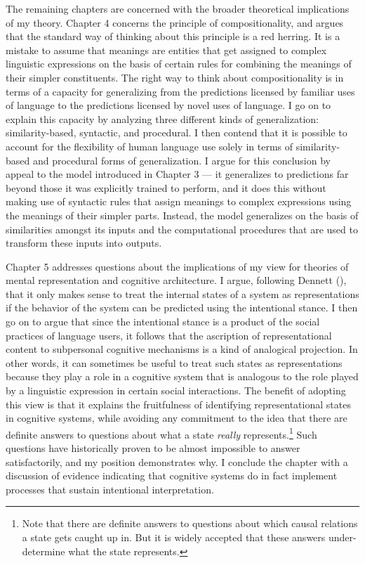 The remaining chapters are concerned with the broader theoretical implications of my theory. Chapter 4 concerns the principle of compositionality, and argues that the standard way of thinking about this principle is a red herring. It is a mistake to assume that meanings are entities that get assigned to complex linguistic expressions on the basis of certain rules for combining the meanings of their simpler constituents. The right way to think about compositionality is in terms of a capacity for generalizing from the predictions licensed by familiar uses of language to the predictions licensed by novel uses of language. I go on to explain this capacity by analyzing three different kinds of generalization: similarity-based, syntactic, and procedural. I then contend that it is possible to account for the flexibility of human language use solely in terms of similarity-based and procedural forms of generalization. I argue for this conclusion by appeal to the model introduced in Chapter 3 --- it generalizes to predictions far beyond those it was explicitly trained to perform, and it does this without making use of syntactic rules that assign meanings to complex expressions using the meanings of their simpler parts. Instead, the model generalizes on the basis of similarities amongst its inputs and the computational procedures that are used to transform these inputs into outputs. 

Chapter 5 addresses questions about the implications of my view for theories of mental representation and cognitive architecture. I argue, following Dennett (\citeyear{Dennett:1987}), that it only makes sense to treat the internal states of a system as representations if the behavior of the system can be predicted using the intentional stance. I then go on to argue that since the intentional stance is a product of the social practices of language users, it follows that the ascription of representational content to subpersonal cognitive mechanisms is a kind of analogical projection. In other words, it can sometimes be useful to treat such states as representations because they play a role in a cognitive system that is analogous to the role played by a linguistic expression in certain social interactions. The benefit of adopting this view is that it explains the fruitfulness of identifying representational states in cognitive systems, while avoiding any commitment to the idea that there are definite answers to questions about what a state \textit{really} represents.\footnote{Note that there are definite answers to questions about which causal relations a state gets caught up in. But it is widely accepted that these answers under-determine what the state represents.} Such questions have historically proven to be almost impossible to answer satisfactorily, and my position demonstrates why. I conclude the chapter with a discussion of evidence indicating that cognitive systems do in fact implement processes that sustain intentional interpretation. 


